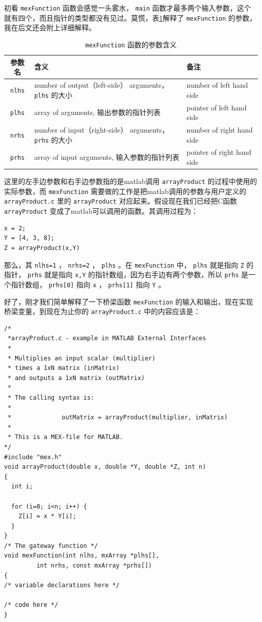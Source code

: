 \documentclass[10pt,a4paper,UTF8]{article}
\begin{document}
初看 \texttt{mexFunction} 函数会感觉一头雾水， \texttt{main} 函数才最多两个输入参数，这个就有四个，而且指针的类型都没有见过。莫慌，表\ref{tab:orgtable1}解释了 \texttt{mexFunction} 的参数，我在后文还会附上详细解释。
\begin{table}[htb]
\caption{\label{tab:orgtable1}
\texttt{mexFunction} 函数的参数含义}
\centering
\begin{tabular}{cll}
\hline
参数名 & 含义 & 备注\\
\hline
\texttt{nlhs} & number of output（left-side） arguments， \texttt{plhs} 的大小 & number of left hand side\\
\texttt{plhs} & array of arguments, 输出参数的指针列表 & pointer of left hand side\\
\texttt{nrhs} & number of input（right-side） arguments， \texttt{prhs} 的大小 & number of right hand side\\
\texttt{prhs} & array of input arguments, 输入参数的指针列表 & pointer of right hand side\\
\hline
\end{tabular}
\end{table}

这里的左手边参数和右手边参数指的是matlab调用 \texttt{arrayProduct} 的过程中使用的实际参数，而 \texttt{mexFunction} 需要做的工作是把matlab调用的参数与用户定义的 \texttt{arrayProduct.c} 里的 \texttt{arrayProduct} 对应起来。假设现在我们已经把C函数 \texttt{arrayProduct} 变成了matlab可以调用的函数。其调用过程为：
\lstset{language=matlab,label= ,caption= ,captionpos=b,numbers=none}
\begin{lstlisting}
x = 2;
Y = [4, 3, 8];
Z = arrayProduct(x,Y)
\end{lstlisting}
那么，其 \texttt{nlhs=1} ， \texttt{nrhs=2} ， \texttt{plhs} 。在 \texttt{mexFunction} 中， \texttt{plhs} 就是指向 \texttt{Z} 的指针， \texttt{prhs} 就是指向 \texttt{x,Y} 的指针数组，因为右手边有两个参数，所以 \texttt{prhs} 是一个指针数组， \texttt{prhs[0]} 指向 \texttt{x} ， \texttt{prhs[1]} 指向 \texttt{Y} 。

好了，刚才我们简单解释了一下桥梁函数 \texttt{mexFunction} 的输入和输出，现在实现桥梁变量，到现在为止你的 \texttt{arrayProduct.c} 中的内容应该是：
\lstset{language=C,label= ,caption= ,captionpos=b,numbers=left}
\begin{lstlisting}
/*
 *arrayProduct.c - example in MATLAB External Interfaces
 *
 * Multiplies an input scalar (multiplier)
 * times a 1xN matrix (inMatrix)
 * and outputs a 1xN matrix (outMatrix)
 *
 * The calling syntax is:
 *
 *              outMatrix = arrayProduct(multiplier, inMatrix)
 *
 * This is a MEX-file for MATLAB.
*/
#include "mex.h"
void arrayProduct(double x, double *Y, double *Z, int n)
{
  int i;

  for (i=0; i<n; i++) {
    Z[i] = x * Y[i];
  }
}
/* The gateway function */
void mexFunction(int nlhs, mxArray *plhs[],
		 int nrhs, const mxArray *prhs[])
{
/* variable declarations here */

/* code here */
}
\end{lstlisting}
\end{document}

